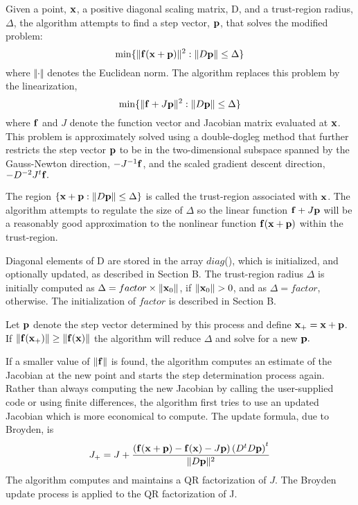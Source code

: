 \documentclass[twoside]{MATH77}
\begin{document}
Given a point, ${\bf x}$, a positive diagonal scaling matrix, D, and a
trust-region radius, $\Delta $, the algorithm attempts to find a step
vector, ${\bf p}$, that solves the modified problem:%
\begin{equation*}
\min \{\Vert {\bf f}({\bf x}+{\bf p})\Vert ^2:\Vert D{\bf p}\Vert \leq
\Delta \}
\end{equation*}
where $\Vert \cdot \Vert $ denotes the Euclidean norm. The algorithm
replaces this problem by the linearization,%
\begin{equation*}
\min \{\Vert {\bf f}+J{\bf p}\Vert ^2:\Vert D{\bf p}\Vert \leq \Delta \}
\end{equation*}
where ${\bf f}$ and $J$ denote the function vector and Jacobian matrix
evaluated at ${\bf x}$. This problem is approximately solved using a
double-dogleg method that further restricts the step vector ${\bf p}$ to be
in the two-dimensional subspace spanned by the Gauss-Newton direction, $%
-J^{-1}{\bf f}$, and the scaled gradient descent direction, $-D^{-2}J^t{\bf f}.$

The region $\{{\bf x}+{\bf p} : \|D{\bf p}\| \leq \Delta \}$ is called the
trust-region associated with ${\bf x}$. The algorithm attempts to regulate
the size of $\Delta $ so the linear function ${\bf f}+J{\bf p}$ will be a
reasonably good approximation to the nonlinear function ${\bf f}({\bf x}+%
{\bf p})$ within the trust-region.

Diagonal elements of D are stored in the array $diag$(), which is initialized,
and optionally updated, as described in Section B. The trust-region radius $%
\Delta $ is initially computed as $\Delta = factor \times \|{\bf x}_0\|$, if $%
\|{\bf x}_0\| > 0$, and as $\Delta = factor$, otherwise. The initialization of
$factor$ is described in Section B.

Let ${\bf p}$ denote the step vector determined by this process and define $%
{\bf x}_+ = {\bf x} + {\bf p}$. If $\|{\bf f}({\bf x}_+)\| \geq
\|{\bf f}({\bf x})\|$ the algorithm will reduce $\Delta $ and solve for
a new ${\bf p}.$

If a smaller value of $\Vert {\bf f}\Vert $ is found, the algorithm computes
an estimate of the Jacobian at the new point and starts the step
determination process again. Rather than always computing the new Jacobian
by calling the user-supplied code or using finite differences, the algorithm
first tries to use an updated Jacobian which is more economical to compute.
The update formula, due to Broyden, is%
\begin{equation*}
J_{+}=J+\frac{\left( {\bf f}({\bf x}+{\bf p})-{\bf f}({\bf x})-J{\bf p}%
\right) \left( D^tD{\bf p}\right) ^t}{\Vert D{\bf p}\Vert ^2}
\end{equation*}
The algorithm computes and maintains a QR factorization of $J$. The Broyden
update process is applied to the QR factorization of J.
\end{document}
